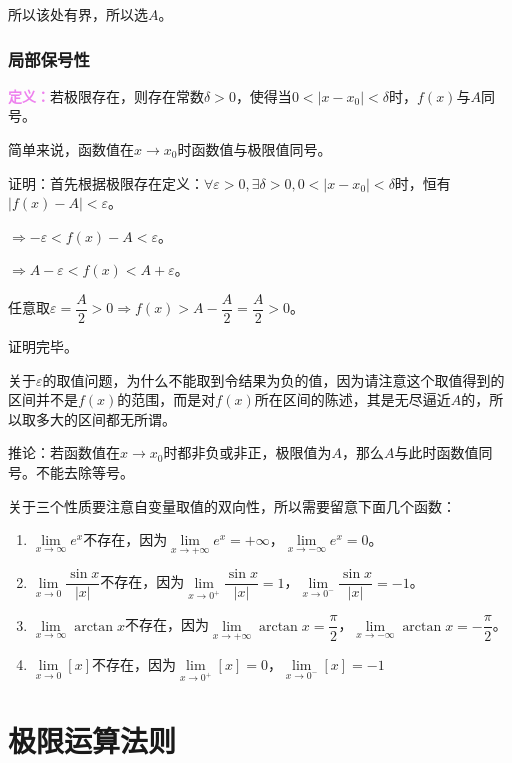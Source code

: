 \documentclass[UTF8, 12pt]{ctexart}
\begin{document}
所以该处有界，所以选$A$。

\subsubsection{局部保号性}

\textcolor{violet}{\textbf{定义：}}若极限存在，则存在常数$\delta>0$，使得当$0<\vert x-x_0\vert<\delta$时，$f(x)$与$A$同号。

简单来说，函数值在$x\to x_0$时函数值与极限值同号。

证明：首先根据极限存在定义：$\forall\varepsilon>0,\exists\delta>0,0<\vert x-x_0\vert<\delta$时，恒有$\vert f(x)-A\vert<\varepsilon$。

$\Rightarrow -\varepsilon<f(x)-A<\varepsilon$。

$\Rightarrow A-\varepsilon<f(x)<A+\varepsilon$。

任意取$\varepsilon=\dfrac{A}{2}>0\Rightarrow f(x)>A-\dfrac{A}{2}=\dfrac{A}{2}>0$。

证明完毕。

关于$\varepsilon$的取值问题，为什么不能取到令结果为负的值，因为请注意这个取值得到的区间并不是$f(x)$的范围，而是对$f(x)$所在区间的陈述，其是无尽逼近$A$的，所以取多大的区间都无所谓。

推论：若函数值在$x\to x_0$时都非负或非正，极限值为$A$，那么$A$与此时函数值同号。不能去除等号。

\medskip

关于三个性质要注意自变量取值的双向性，所以需要留意下面几个函数：

\begin{enumerate}
    \item $\lim\limits_{x\to\infty}e^x$不存在，因为$\lim\limits_{x\to +\infty}e^x=+\infty$，$\lim\limits_{x\to -\infty}e^x=0$。
    \item $\lim\limits_{x\to 0}\dfrac{\sin x}{\vert x\vert}$不存在，因为$\lim\limits_{x\to 0^+}\dfrac{\sin x}{\vert x\vert}=1$，$\lim\limits_{x\to 0^-}\dfrac{\sin x}{\vert x\vert}=-1$。
    \item $\lim\limits_{x\to\infty}\arctan x$不存在，因为$\lim\limits_{x\to +\infty}\arctan x=\dfrac{\pi}{2}$，$\lim\limits_{x\to -\infty}\arctan x=-\dfrac{\pi}{2}$。
    \item $\lim\limits_{x\to 0}[x]$不存在，因为$\lim\limits_{x\to 0^+}[x]=0$，$\lim\limits_{x\to 0^-}[x]=-1$
\end{enumerate}

\section{极限运算法则}
\end{document}
